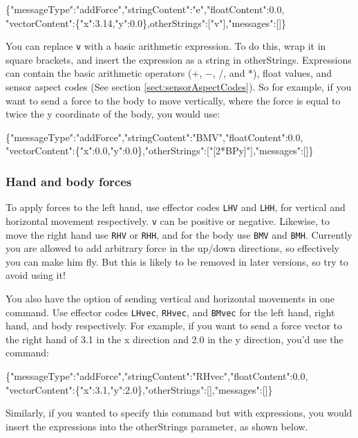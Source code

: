 \begin{center}
\scriptsize{\{"messageType":"addForce","stringContent":"e","floatContent":0.0,
	"vectorContent":\{"x":3.14,"y":0.0\},otherStrings":["v"],"messages":[]\}}
\end{center}

You can replace \texttt{v} with a basic arithmetic expression. To do this, wrap it in square brackets, and insert the expression as a string in otherStrings. Expressions can contain the basic arithmetic operators ($+$, $-$, $/$, and $*$), float values, and sensor aspect codes (See section \ref{sect:sensorAspectCodes}). So for example, if you want to send a force to the body to move vertically, where the force is equal to twice the y coordinate of the body, you would use:

\begin{center}
\scriptsize{\{"messageType":"addForce","stringContent":"BMV","floatContent":0.0, "vectorContent":\{"x":0.0,"y":0.0\},"otherStrings":["[2*BPy]"],"messages":[]\}}
\end{center}

\subsubsection{Hand and body forces}

To apply forces to the left hand, use effector codes \texttt{LHV} and \texttt{LHH}, for vertical and horizontal movement respectively. \texttt{v} can be positive or negative. Likewise, to move the right hand use \texttt{RHV} or \texttt{RHH}, and for the body use \texttt{BMV} and \texttt{BMH}. Currently you are allowed to add arbitrary force in the up/down directions, so effectively you can make him fly. But this is likely to be removed in later versions, so try to avoid using it!

You also have the option of sending vertical and horizontal movements in one command. Use effector codes \texttt{LHvec}, \texttt{RHvec}, and \texttt{BMvec} for the left hand, right hand, and body respectively. For example, if you want to send a force vector to the right hand of 3.1 in the x direction and 2.0 in the y direction, you'd use the command:

\begin{center}
\scriptsize{\{"messageType":"addForce","stringContent":"RHvec","floatContent":0.0,  "vectorContent":\{"x":3.1,"y":2.0\},"otherStrings":[],"messages":[]\}}
\end{center}

Similarly, if you wanted to specify this command but with expressions, you would insert the expressions into the otherStrings parameter, as shown below. 

